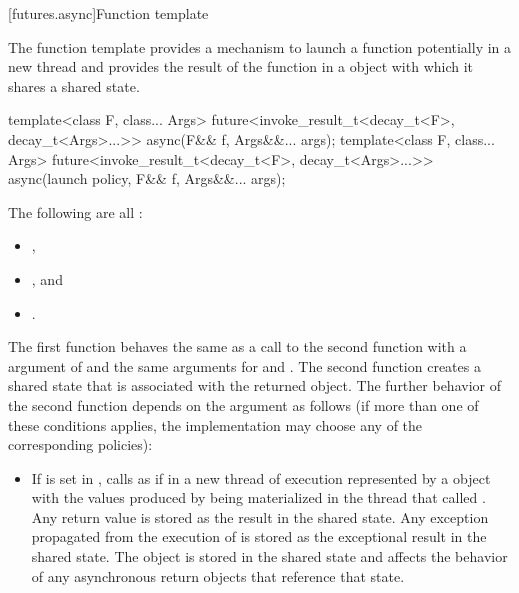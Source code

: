 [futures.async]{Function template }

\pnum
The function template  provides a mechanism to launch a function potentially
in a new thread and provides the result of the function in a  object with which
it shares a shared state.

%
\begin{itemdecl}
template<class F, class... Args>
  future<invoke_result_t<decay_t<F>, decay_t<Args>...>>
    async(F&& f, Args&&... args);
template<class F, class... Args>
  future<invoke_result_t<decay_t<F>, decay_t<Args>...>>
    async(launch policy, F&& f, Args&&... args);
\end{itemdecl}

\begin{itemdescr}
\pnum
\mandates
The following are all :
\begin{itemize}
\item {},
\item {}, and
\item {}.
\end{itemize}

\pnum
\effects
The first function
behaves the same as a call to the second function with a  argument of
and the same arguments for  and .
The second function creates a shared state that is associated with
the returned  object.
The further behavior
of the second function depends on the  argument as follows (if
more than one of these conditions applies, the implementation may choose any of
the corresponding policies):

\begin{itemize}
\item
If  is set in , calls
as if in a new thread of execution represented by a  object
with the values produced by 
being materialized in the thread that called .
Any return value
is stored as the result in the
shared state. Any exception propagated from
the execution of
is stored as the exceptional result in the shared state.
The  object is
stored in the shared state
and affects the behavior of any asynchronous return objects that
reference that state.


\end{itemize}
\end{itemdescr}
